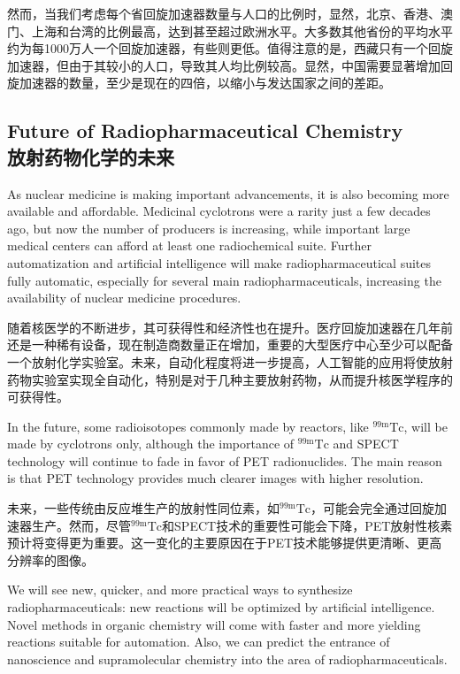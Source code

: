 \documentclass[dvipsnames, svgnames,a4paper,11pt]{article}
\begin{document}
然而，当我们考虑每个省回旋加速器数量与人口的比例时，显然，北京、香港、澳门、上海和台湾的比例最高，达到甚至超过欧洲水平。大多数其他省份的平均水平约为每1000万人一个回旋加速器，有些则更低。值得注意的是，西藏只有一个回旋加速器，但由于其较小的人口，导致其人均比例较高。显然，中国需要显著增加回旋加速器的数量，至少是现在的四倍，以缩小与发达国家之间的差距。

\subsection{Future of Radiopharmaceutical Chemistry\\放射药物化学的未来}

As nuclear medicine is making important advancements, it is also becoming more available and affordable. Medicinal cyclotrons were a rarity just a few decades ago, but now the number of producers is increasing, while important large medical centers can afford at least one radiochemical suite. Further automatization and artificial intelligence will make radiopharmaceutical suites fully automatic, especially for several main radiopharmaceuticals, increasing the availability of nuclear medicine procedures.  

随着核医学的不断进步，其可获得性和经济性也在提升。医疗回旋加速器在几年前还是一种稀有设备，现在制造商数量正在增加，重要的大型医疗中心至少可以配备一个放射化学实验室。未来，自动化程度将进一步提高，人工智能的应用将使放射药物实验室实现全自动化，特别是对于几种主要放射药物，从而提升核医学程序的可获得性。

In the future, some radioisotopes commonly made by reactors, like \(\mathrm{^{99m}Tc}\), will be made by cyclotrons only, although the importance of \(\mathrm{^{99m}Tc}\) and SPECT technology will continue to fade in favor of PET radionuclides. The main reason is that PET technology provides much clearer images with higher resolution.  

未来，一些传统由反应堆生产的放射性同位素，如${}^\text{99m}\text{Tc}$，可能会完全通过回旋加速器生产。然而，尽管${}^\text{99m}\text{Tc}$和SPECT技术的重要性可能会下降，PET放射性核素预计将变得更为重要。这一变化的主要原因在于PET技术能够提供更清晰、更高分辨率的图像。

We will see new, quicker, and more practical ways to synthesize radiopharmaceuticals: new reactions will be optimized by artificial intelligence. Novel methods in organic chemistry will come with faster and more yielding reactions suitable for automation. Also, we can predict the entrance of nanoscience and supramolecular chemistry into the area of radiopharmaceuticals.  
\end{document}
